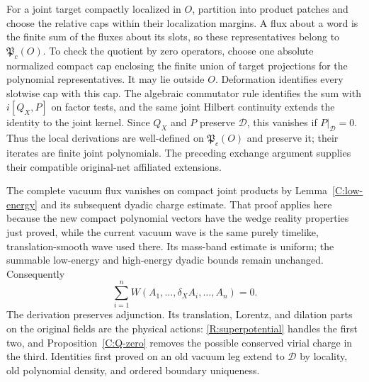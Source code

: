 For a joint target compactly localized in $O$, partition into product
patches and choose the relative caps within their localization margins.
A flux about a word is the finite sum of the fluxes about its slots, so
these representatives belong to $\mathfrak P_c(O)$.  To check the quotient
by zero operators, choose one absolute normalized compact cap enclosing
the finite union of target projections for the polynomial representatives.
It may lie outside $O$.  Deformation identifies every slotwise cap with
this cap.  The algebraic commutator rule identifies the sum with
$i[Q_X,P]$ on factor tests, and the same joint Hilbert continuity
extends the identity to the joint kernel.  Since $Q_X$ and $P$ preserve $\mathcal D$,
this vanishes if $P|_{\mathcal D}=0$.  Thus the local derivations are
well-defined on $\mathfrak P_c(O)$ and preserve it; their iterates are
finite joint polynomials.  The preceding exchange argument supplies
their compatible original-net affiliated extensions.

The complete vacuum flux vanishes on compact joint products by
Lemma~\ref{C:low-energy} and its subsequent dyadic charge estimate.
That proof applies here because the new compact polynomial vectors
have the wedge reality properties just proved, while the current
vacuum wave is the same purely timelike, translation-smooth wave
used there.  Its mass-band estimate is uniform; the summable
low-energy and high-energy dyadic bounds remain unchanged.
Consequently
\begin{equation}\label{R:vacuum-Ward}
 \sum_{i=1}^n
 W(A_1,\ldots,\delta_XA_i,\ldots,A_n)=0.
\end{equation}
The derivation preserves adjunction.  Its translation, Lorentz, and
dilation parts on the original fields are the physical actions:
\eqref{R:superpotential} handles the first two, and
Proposition~\ref{C:Q-zero} removes the possible conserved virial
charge in the third.  Identities first proved on an old vacuum leg
extend to $\mathcal D$ by locality, old polynomial density, and
ordered boundary uniqueness.

